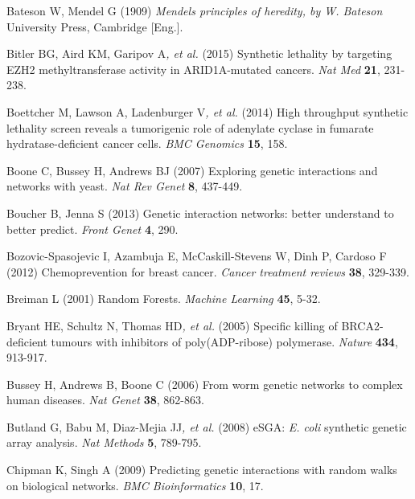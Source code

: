 Bateson W, Mendel G (1909) \textit{Mendel{\textquotesingle}s principles
of heredity, by W. Bateson} University Press, Cambridge [Eng.].



\hypertarget{ENREF13}{}Bitler BG, Aird KM, Garipov A\textit{, et al.}
(2015) Synthetic lethality by targeting EZH2 methyltransferase activity
in ARID1A-mutated cancers. \textit{Nat Med} \textbf{21}, 231-238.



\hypertarget{ENREF14}{}Boettcher M, Lawson A, Ladenburger V\textit{, et
al.} (2014) High throughput synthetic lethality screen reveals a
tumorigenic role of adenylate cyclase in fumarate hydratase-deficient
cancer cells. \textit{BMC Genomics} \textbf{15}, 158.



\hypertarget{ENREF15}{}Boone C, Bussey H, Andrews BJ (2007) Exploring
genetic interactions and networks with yeast. \textit{Nat Rev Genet}
\textbf{8}, 437-449.



\hypertarget{ENREF16}{}Boucher B, Jenna S (2013) Genetic interaction
networks: better understand to better predict. \textit{Front Genet}
\textbf{4}, 290.



Bozovic-Spasojevic I, Azambuja E, McCaskill-Stevens W, Dinh P, Cardoso F
(2012) Chemoprevention for breast cancer. \textit{Cancer treatment
reviews} \textbf{38}, 329-339.



\hypertarget{ENREF18}{}Breiman L (2001) Random Forests. \textit{Machine
Learning} \textbf{45}, 5-32.



\hypertarget{ENREF19}{}Bryant HE, Schultz N, Thomas HD\textit{, et al.}
(2005) Specific killing of BRCA2-deficient tumours with inhibitors of
poly(ADP-ribose) polymerase. \textit{Nature} \textbf{434}, 913-917.



Bussey H, Andrews B, Boone C (2006) From worm genetic networks to
complex human diseases. \textit{Nat Genet} \textbf{38}, 862-863.



Butland G, Babu M, Diaz-Mejia JJ\textit{, et al.} (2008) eSGA:
\textit{E. coli }synthetic genetic array analysis. \textit{Nat Methods}
\textbf{5}, 789-795.



\hypertarget{ENREF22}{}Chipman K, Singh A (2009) Predicting genetic
interactions with random walks on biological networks. \textit{BMC
Bioinformatics} \textbf{10}, 17.



